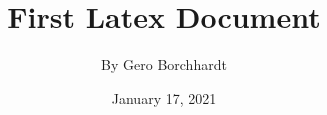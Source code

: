 \documentclass[a4paper,12pt]{book}
\begin{document}
\title{\Large{\textbf{First Latex Document}}}
\author {By Gero Borchhardt}
\date{January 17, 2021}

\maketitle

\blindtext[5]
\end{document}
